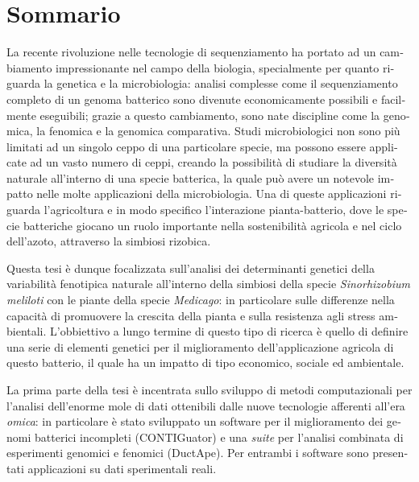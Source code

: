 \chapter{Sommario}
\begin{otherlanguage}{italian}

\small
La recente rivoluzione nelle tecnologie di sequenziamento ha portato ad un cambiamento impressionante nel campo della biologia, specialmente per quanto riguarda la genetica e la microbiologia: analisi complesse come il sequenziamento completo di un genoma batterico sono divenute economicamente possibili e facilmente eseguibili; grazie a questo cambiamento, sono nate discipline come la genomica, la fenomica e la genomica comparativa. Studi microbiologici non sono più limitati ad un singolo ceppo di una particolare specie, ma possono essere applicate ad un vasto numero di ceppi, creando la possibilità di studiare la diversità naturale all'interno di una specie batterica, la quale può avere un notevole impatto nelle molte applicazioni della microbiologia. Una di queste applicazioni riguarda l'agricoltura e in modo specifico l'interazione pianta-batterio, dove le specie batteriche giocano un ruolo importante nella sostenibilità agricola e nel ciclo dell'azoto, attraverso la simbiosi rizobica.

Questa tesi è dunque focalizzata sull'analisi dei determinanti genetici della variabilità fenotipica naturale all'interno della simbiosi della specie \textit{Sinorhizobium meliloti} con le piante della specie \textit{Medicago}: in particolare sulle differenze nella capacità di promuovere la crescita della pianta e sulla resistenza agli stress ambientali. L'obbiettivo a lungo termine di questo tipo di ricerca è quello di definire una serie di elementi genetici per il miglioramento dell'applicazione agricola di questo batterio, il quale ha un impatto di tipo economico, sociale ed ambientale.

La prima parte della tesi è incentrata sullo sviluppo di metodi computazionali per l'analisi dell'enorme mole di dati ottenibili dalle nuove tecnologie afferenti all'era \textit{omica}: in particolare è stato sviluppato un software per il miglioramento dei genomi batterici incompleti (CONTIGuator) e una \textit{suite} per l'analisi combinata di esperimenti genomici e fenomici (DuctApe). Per entrambi i software sono presentati applicazioni su dati sperimentali reali.


\end{otherlanguage}
